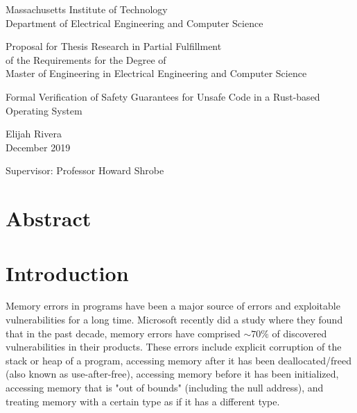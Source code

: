 \documentclass[12pt]{article}
\begin{document}
\begin{titlepage}
   \begin{center}
       \vspace*{1cm}
       Massachusetts Institute of Technology \\
       Department of Electrical Engineering and Computer Science
 
       \vspace{1cm}
       Proposal for Thesis Research in Partial Fulfillment \\
       of the Requirements for the Degree of \\
       Master of Engineering in Electrical Engineering and Computer Science
 
       \vspace{1cm}
 
       Formal Verification of Safety Guarantees for Unsafe Code in a Rust-based Operating System
 
       \vspace{1cm}
       Elijah Rivera \\
       December 2019
 
       \vspace{1cm}
        Supervisor: Professor Howard Shrobe
   \end{center}
\end{titlepage}

\section{Abstract}


\section{Introduction}

Memory errors in programs have been a major source of errors and exploitable vulnerabilities for a long time. Microsoft recently did a study where they found that in the past decade, memory errors have comprised $\sim70\%$ of discovered vulnerabilities in their products. %
These errors include explicit corruption of the stack or heap of a program, accessing memory after it has been deallocated/freed (also known as use-after-free), accessing memory before it has been initialized, accessing memory that is "out of bounds" (including the null address), and treating memory with a certain type as if it has a different type.
\end{document}
